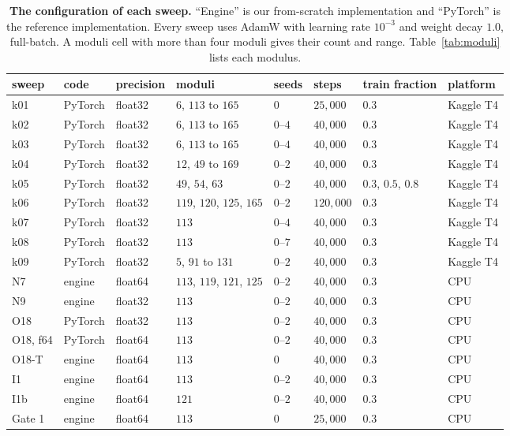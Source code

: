 \begin{table}[ht]
  \centering
  \footnotesize
  \caption{\textbf{The configuration of each sweep.} ``Engine'' is our from-scratch
    implementation and ``PyTorch'' is the reference implementation. Every sweep uses AdamW
    with learning rate $10^{-3}$ and weight decay $1.0$, full-batch. A moduli cell with more
    than four moduli gives their count and range. Table~\ref{tab:moduli} lists each modulus.}
  \label{tab:sweeps}
  \begin{tabular}{llllllll}
    \toprule
    sweep & code & precision & moduli & seeds & steps & train fraction & platform \\
    \midrule
    k01 & PyTorch & float32 & $6$, $113$ to $165$ & $0$ & $25{,}000$ & $0.3$ & Kaggle T4 \\
    k02 & PyTorch & float32 & $6$, $113$ to $165$ & $0$--$4$ & $40{,}000$ & $0.3$ & Kaggle T4 \\
    k03 & PyTorch & float32 & $6$, $113$ to $165$ & $0$--$4$ & $40{,}000$ & $0.3$ & Kaggle T4 \\
    k04 & PyTorch & float32 & $12$, $49$ to $169$ & $0$--$2$ & $40{,}000$ & $0.3$ & Kaggle T4 \\
    k05 & PyTorch & float32 & $49$, $54$, $63$ & $0$--$2$ & $40{,}000$ & $0.3$, $0.5$, $0.8$ & Kaggle T4 \\
    k06 & PyTorch & float32 & $119$, $120$, $125$, $165$ & $0$--$2$ & $120{,}000$ & $0.3$ & Kaggle T4 \\
    k07 & PyTorch & float32 & $113$ & $0$--$4$ & $40{,}000$ & $0.3$ & Kaggle T4 \\
    k08 & PyTorch & float32 & $113$ & $0$--$7$ & $40{,}000$ & $0.3$ & Kaggle T4 \\
    k09 & PyTorch & float32 & $5$, $91$ to $131$ & $0$--$2$ & $40{,}000$ & $0.3$ & Kaggle T4 \\
    N7 & engine & float64 & $113$, $119$, $121$, $125$ & $0$--$2$ & $40{,}000$ & $0.3$ & CPU \\
    N9 & engine & float32 & $113$ & $0$--$2$ & $40{,}000$ & $0.3$ & CPU \\
    O18 & PyTorch & float32 & $113$ & $0$--$2$ & $40{,}000$ & $0.3$ & CPU \\
    O18, f64 & PyTorch & float64 & $113$ & $0$--$2$ & $40{,}000$ & $0.3$ & CPU \\
    O18-T & engine & float64 & $113$ & $0$ & $40{,}000$ & $0.3$ & CPU \\
    I1 & engine & float64 & $113$ & $0$--$2$ & $40{,}000$ & $0.3$ & CPU \\
    I1b & engine & float64 & $121$ & $0$--$2$ & $40{,}000$ & $0.3$ & CPU \\
    Gate 1 & engine & float64 & $113$ & $0$ & $25{,}000$ & $0.3$ & CPU \\
    \bottomrule
  \end{tabular}
\end{table}

